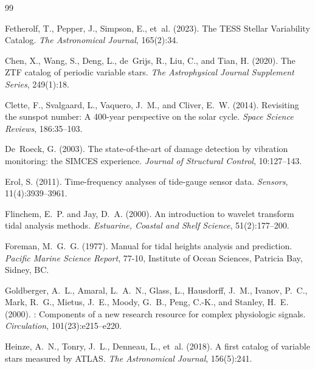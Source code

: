 \documentclass[11pt,a4paper]{article}
\begin{document}
\begin{thebibliography}{99}

Fetherolf, T., Pepper, J., Simpson, E., et~al. (2023).
\newblock The {TESS} Stellar Variability Catalog.
\newblock \textit{The Astronomical Journal}, 165(2):34.

Chen, X., Wang, S., Deng, L., de~Grijs, R., Liu, C., and Tian, H. (2020).
\newblock The {ZTF} catalog of periodic variable stars.
\newblock \textit{The Astrophysical Journal Supplement Series}, 249(1):18.

Clette, F., Svalgaard, L., Vaquero, J.~M., and Cliver, E.~W. (2014).
\newblock Revisiting the sunspot number: A 400-year perspective on the solar cycle.
\newblock \textit{Space Science Reviews}, 186:35--103.

De~Roeck, G. (2003).
\newblock The state-of-the-art of damage detection by vibration monitoring: the {SIMCES} experience.
\newblock \textit{Journal of Structural Control}, 10:127--143.

Erol, S. (2011).
\newblock Time-frequency analyses of tide-gauge sensor data.
\newblock \textit{Sensors}, 11(4):3939--3961.

Flinchem, E.~P. and Jay, D.~A. (2000).
\newblock An introduction to wavelet transform tidal analysis methods.
\newblock \textit{Estuarine, Coastal and Shelf Science}, 51(2):177--200.

Foreman, M.~G.~G. (1977).
\newblock Manual for tidal heights analysis and prediction.
\newblock \textit{Pacific Marine Science Report}, 77-10, Institute of Ocean Sciences, Patricia Bay, Sidney, BC.

Goldberger, A.~L., Amaral, L.~A.~N., Glass, L., Hausdorff, J.~M., Ivanov, P.~C., Mark, R.~G., Mietus, J.~E., Moody, G.~B., Peng, C.-K., and Stanley, H.~E. (2000).
: Components of a new research resource for complex physiologic signals.
\newblock \textit{Circulation}, 101(23):e215--e220.

Heinze, A.~N., Tonry, J.~L., Denneau, L., et~al. (2018).
\newblock A first catalog of variable stars measured by {ATLAS}.
\newblock \textit{The Astronomical Journal}, 156(5):241.


\end{thebibliography}
\end{document}
